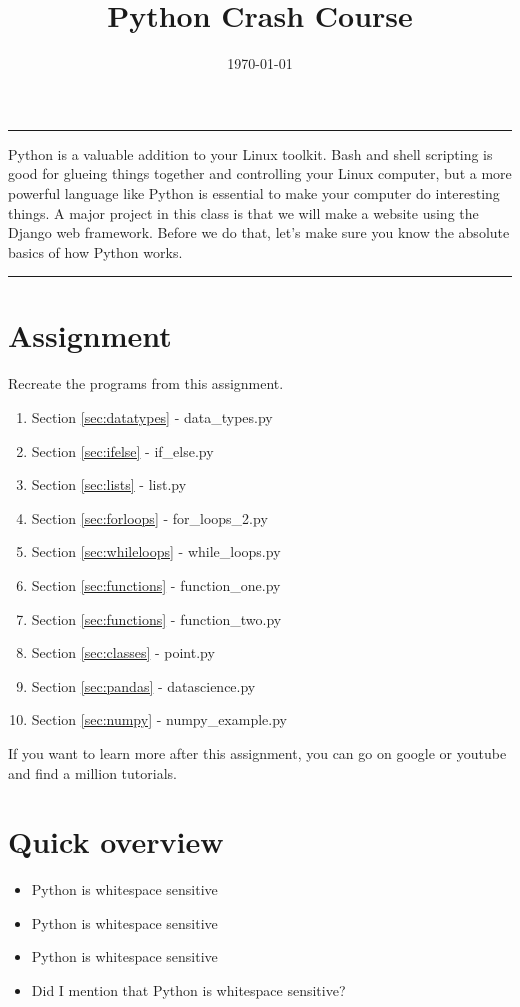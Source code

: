 \documentclass[12pt,a4]{article}
\renewenvironment{abstract}{%
\hfill\begin{minipage}{0.95\textwidth}
\rule{\textwidth}{1pt}}
{\par\noindent\rule{\textwidth}{1pt}\end{minipage}}
\begin{document}
%
\title{\textbf{Python Crash Course}}
\date{\today}
%
\maketitle
%
\begin{abstract}
Python is a valuable addition to your Linux toolkit. Bash and shell scripting is good for glueing things together and controlling your Linux computer, but a more powerful language like Python is essential to make your computer do interesting things. A major project in this class is that we will make a website using the Django web framework. Before we do that, let's make sure you know the absolute basics of how Python works.
\end{abstract}

\section{Assignment}
Recreate the programs from this assignment.
\begin{enumerate}
\item Section \ref{sec:datatypes} - data\_types.py
\item Section \ref{sec:ifelse} - if\_else.py
\item Section \ref{sec:lists} - list.py
\item Section \ref{sec:forloops} - for\_loops\_2.py
\item Section \ref{sec:whileloops} - while\_loops.py
\item Section \ref{sec:functions} - function\_one.py
\item Section \ref{sec:functions} - function\_two.py
\item Section \ref{sec:classes} - point.py
\item Section \ref{sec:pandas} - datascience.py
\item Section \ref{sec:numpy} - numpy\_example.py
\end{enumerate}

If you want to learn more after this assignment, you can go on google or youtube and find a million tutorials.

\section{Quick overview}

\begin{itemize}
    \item Python is whitespace sensitive
    \item Python is whitespace sensitive
    \item Python is whitespace sensitive
    \item Did I mention that Python is whitespace sensitive?
\end{itemize}
\end{document}
